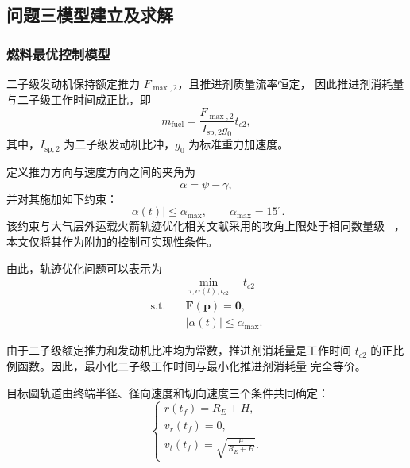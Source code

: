 \documentclass{JXUSTmodeling}
\begin{document}
\subsection{问题三模型建立及求解}
\label{sec:5.3}
\subsubsection{燃料最优控制模型}
二子级发动机保持额定推力 $F_{\max,2}$，且推进剂质量流率恒定，
因此推进剂消耗量与二子级工作时间成正比，即
\begin{equation}
	m_{\mathrm{fuel}}
	=
	\frac{F_{\max,2}}
	{I_{\mathrm{sp},2}g_0}
	t_{c2},
	\label{eq:fuel_consumption}
\end{equation}
其中，$I_{\mathrm{sp},2}$ 为二子级发动机比冲，$g_0$ 为标准重力加速度。

定义推力方向与速度方向之间的夹角为
\begin{equation}
	\alpha=\psi-\gamma,
	\label{eq:angle_of_attack}
\end{equation}
并对其施加如下约束：
\begin{equation}
	\lvert\alpha(t)\rvert
	\leq
	\alpha_{\max},
	\qquad
	\alpha_{\max}=15^\circ.
	\label{eq:angle_constraint}
\end{equation}
该约束与大气层外运载火箭轨迹优化相关文献采用的攻角上限处于相同数量级
~\cite{orgeira2022,civek2017}，本文仅将其作为附加的控制可实现性条件。

由此，轨迹优化问题可以表示为
\begin{equation}
	\begin{aligned}
		& \underset{\tau,\alpha(t),t_{c2}}{\min}
		\quad
		t_{c2} \\
		\text{s.t.}
		\quad
		& \mathbf{F}(\mathbf{p})=\mathbf{0}, \\
		& \lvert\alpha(t)\rvert
		\leq
		\alpha_{\max}.
	\end{aligned}
	\label{eq:trajectory_optimization}
\end{equation}

由于二子级额定推力和发动机比冲均为常数，推进剂消耗量是工作时间
$t_{c2}$ 的正比例函数。因此，最小化二子级工作时间与最小化推进剂消耗量
完全等价。

目标圆轨道由终端半径、径向速度和切向速度三个条件共同确定：
\begin{equation}
	\begin{cases}
		r(t_f)=R_E+H, \\[3pt]
		v_r(t_f)=0, \\[3pt]
		v_t(t_f)=
		\displaystyle
		\sqrt{\frac{\mu}{R_E+H}}.
	\end{cases}
	\label{eq:terminal_orbit_constraints}
\end{equation}
\end{document}
